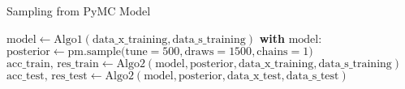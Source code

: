 \begin{algorithm}[H]
	\caption{Sampling from PyMC Model}
	\begin{algorithmic}[1]
		\State $\text{model} \gets \text{Algo1}(\text{data\_x\_training}, \text{data\_s\_training})$
		\State \textbf{with} $\text{model}:$
		\State \quad $\text{posterior} \gets \text{pm.sample(tune}=500, \text{draws}=1500, \text{chains}=1)$
		\State $\text{acc\_train, res\_train} \gets \text{Algo2}(\text{model}, \text{posterior}, \text{data\_x\_training}, \text{data\_s\_training})$
		\State $\text{acc\_test, res\_test} \gets \text{Algo2}(\text{model}, \text{posterior}, \text{data\_x\_test}, \text{data\_s\_test})$
	\end{algorithmic}
\end{algorithm}